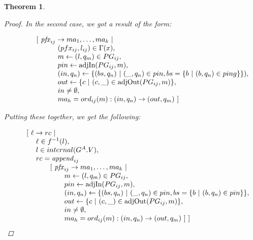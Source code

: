 \documentclass[twocolumn, openany]{sig-alternate-10pt}
\newtheorem{thm}{Theorem}
\begin{document}
\begin{thm}
\begin{proof}
  In the second case, we got a result of the form:

 \[ \begin{array}{l}
     ~~~~~~~~~ [~ \mathit{pfx}_{ij} \rightarrow ma_1, \dots, ma_k ~\vert~ \\
     ~~~~~~~~~~~~~~~~~~ (pfx_{ij}, l_{ij}) \in \Gamma(x), \\
     ~~~~~~~~~~~~~~~~~~ m \leftarrow (l,q_m) \in PG_{ij}, \\
     ~~~~~~~~~~~~~~~~~~ pin \leftarrow \text{adjIn}(PG_{ij},m), \\
     ~~~~~~~~~~~~~~~~~~ (in,q_n) \leftarrow \{ (bs,q_n) ~\vert~ (\_,q_n) \in pin, bs=\{ b ~\vert~ (b,q_n) \in ping \} \}), \\
     ~~~~~~~~~~~~~~~~~~ out \leftarrow \{ c ~\vert~ (c,\_) \in \text{adjOut}(PG_{ij},m) \}, \\
     ~~~~~~~~~~~~~~~~~~ in \neq \emptyset, \\
     ~~~~~~~~~~~~~~~~~~ ma_h = ord_{ij}(m) : (in,q_n) \rightarrow (out,q_m) ~] \\
  \end{array} \]%

  Putting these together, we get the following:

  \[ \begin{array}{l}
     ~~~~~ [~ \ell \rightarrow rc ~\vert~ \\
     ~~~~~~~~~ \ell \in f^{-1}(l), \\
     ~~~~~~~~~ l \in internal(G^A.V), \\
     ~~~~~~~~~ rc = \mathit{append}_{ij}~  \\
     ~~~~~~~~~~~~~~~ [~ \mathit{pfx}_{ij} \rightarrow ma_1, \dots, ma_k ~\vert~ \\
     ~~~~~~~~~~~~~~~~~~~~~ m \leftarrow (l,q_m) \in PG_{ij}, \\
     ~~~~~~~~~~~~~~~~~~~~~ pin \leftarrow \text{adjIn}(PG_{ij},m), \\
     ~~~~~~~~~~~~~~~~~~~~~ (in,q_n) \leftarrow \{ (bs,q_n) ~\vert~ (\_,q_n) \in pin, bs=\{b ~\vert~ (b,q_n) \in pin \} \}, \\
     ~~~~~~~~~~~~~~~~~~~~~ out \leftarrow \{ c ~\vert~ (c,\_) \in \text{adjOut}(PG_{ij},m) \}, \\
     ~~~~~~~~~~~~~~~~~~~~~ in \neq \emptyset, \\
     ~~~~~~~~~~~~~~~~~~~~~ ma_h = ord_{ij}(m) : (in,q_n) \rightarrow (out,q_m) ~] ~] \\
  \end{array} \]%



\end{proof}
\end{thm}
\end{document}
